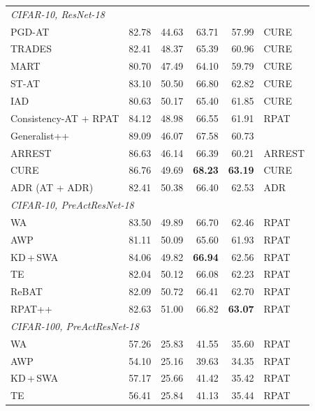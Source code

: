 \begin{table}[!htbp]
\begin{tabular}{lrrrrl}
    \midrule
    \multicolumn{6}{l}{\emph{CIFAR-10, ResNet-18}} \\
    PGD-AT                    & 82.78 & 44.63 & 63.71 & 57.99 & CURE \\
    TRADES                    & 82.41 & 48.37 & 65.39 & 60.96 & CURE \\
    MART                      & 80.70 & 47.49 & 64.10 & 59.79 & CURE \\
    ST-AT                     & 83.10 & 50.50 & 66.80 & 62.82 & CURE \\
    IAD                       & 80.63 & 50.17 & 65.40 & 61.85 & CURE \\
    Consistency-AT + RPAT     & 84.12 & 48.98 & 66.55 & 61.91 & RPAT \\
    Generalist++              & 89.09 & 46.07 & 67.58 & 60.73 & \citet{generalist} \\
    ARREST                    & 86.63 & 46.14 & 66.39 & 60.21 & ARREST \\
    CURE                      & 86.76 & 49.69 & \textbf{68.23} & \textbf{63.19} & CURE \\
    ADR (AT + ADR)            & 82.41 & 50.38 & 66.40 & 62.53 & ADR \\
    \midrule
    \multicolumn{6}{l}{\emph{CIFAR-10, PreActResNet-18}} \\
    WA \citep{swa}            & 83.50 & 49.89 & 66.70 & 62.46 & RPAT \\
    AWP \citep{2020_awp}      & 81.11 & 50.09 & 65.60 & 61.93 & RPAT \\
    KD\,+\,SWA \citep{kdswa}   & 84.06 & 49.82 & \textbf{66.94} & 62.56 & RPAT \\
    TE \citep{te}             & 82.04 & 50.12 & 66.08 & 62.23 & RPAT \\
    ReBAT \citep{rebat}       & 82.09 & 50.72 & 66.41 & 62.70 & RPAT \\
    RPAT++ \citep{rpat}       & 82.63 & 51.00 & 66.82 & \textbf{63.07} & RPAT \\
    \midrule
    \multicolumn{6}{l}{\emph{CIFAR-100, PreActResNet-18}} \\
    WA \citep{swa}            & 57.26 & 25.83 & 41.55 & 35.60 & RPAT \\
    AWP \citep{2020_awp}      & 54.10 & 25.16 & 39.63 & 34.35 & RPAT \\
    KD\,+\,SWA \citep{kdswa}   & 57.17 & 25.66 & 41.42 & 35.42 & RPAT \\
    TE \citep{te}             & 56.41 & 25.84 & 41.13 & 35.44 & RPAT \\

\end{tabular}
\end{table}
